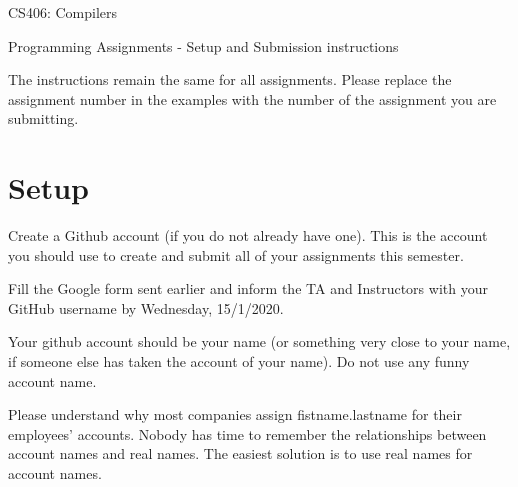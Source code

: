\documentclass{article}
\begin{document}
\begin{center}{\LARGE CS406: Compilers} \end{center}
\begin{center}{\large Programming Assignments - Setup and Submission instructions} \end{center}

\bigskip

The instructions remain the same for all assignments. Please replace the assignment number in the examples with the number of the assignment you are submitting. 

\section{Setup}

Create a Github account (if you do not already have one). This is the account you should use to create and submit all of your assignments this semester.

Fill the Google form sent earlier and inform the TA and Instructors with your GitHub username by Wednesday, 15/1/2020. 

Your github account should be your name (or something very close to your name, if someone else has taken the account of your name). Do not use any funny account name.

Please understand why most companies assign fistname.lastname for their employees' accounts. Nobody has time to remember the relationships between account names and real names. The easiest solution is to use real names for account names.
\end{document}
